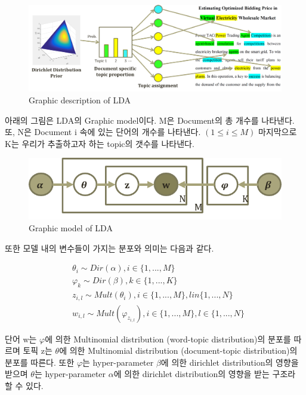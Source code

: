 \documentclass[draft=false]{oblivoir}
\begin{document}
\begin{figure}[ht] \centering 
\includegraphics[scale=0.5]{fig11_10.png} 
\caption{Graphic description of LDA}
\label{fig:11-10}
\end{figure}

아래의 그림은 LDA의 Graphic model이다. M은 Document의 총 개수를 나타낸다. 또, N은 Document i 속에 있는 단어의 개수를 나타낸다. $(1 \leq i \leq M)$ 마지막으로 K는 우리가 추출하고자 하는 topic의 갯수를 나타낸다. 

\begin{figure}[ht] \centering 
\includegraphics[scale=0.8]{fig11_11.png} 
\caption{Graphic model of LDA}
\label{fig:11-11}
\end{figure}

또한 모델 내의 변수들이 가지는 분포와 의미는 다음과 같다. 

\begin{eqnarray*}
&\theta_{i} \sim Dir(\alpha), i \in \{1,...,M\}\nonumber\\
&\varphi_{k} \sim Dir(\beta), k \in \{1,...,K\}\nonumber\\
&z_{i,l} \sim Mult(\theta_{i}), i \in \{1,...,M\}, l in \{1,...,N\}\nonumber\\
&w_{i,l} \sim Mult(\varphi_{z_{i,l}}), i \in \{1,...,M\},l \in \{1,...,N\}\nonumber
\end{eqnarray*}

단어 w는 $ \varphi $에 의한 Multinomial distribution (word-topic distribution)의 분포를 따르며 토픽 z는 $\theta$에 의한 Multinomial distribution (document-topic distribution)의 분포를 따른다. 또한 $ \varphi $는 hyper-parameter $\beta$에 의한 dirichlet distribution의 영향을 받으며 $\theta$는  hyper-parameter $\alpha$에 의한 dirichlet distribution의 영향을 받는 구조라 할 수 있다. 
\end{document}
